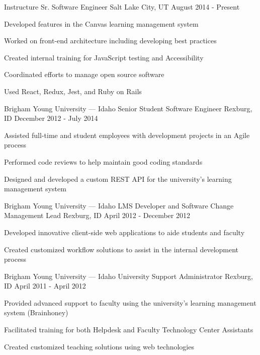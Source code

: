 \begin{cventries}
  \cventry
    {Instructure}
    {Sr. Software Engineer}
    {Salt Lake City, UT}
    {August 2014 - Present}
    {
      \begin{cvitems}
        \item {Developed features in the Canvas learning management system}
        \item {Worked on front-end architecture including developing best practices}
        \item {Created internal training for JavaScript testing and Accessibility}
        \item {Coordinated efforts to manage open source software}
        \item {Used React, Redux, Jest, and Ruby on Rails}
      \end{cvitems}
    }
  \cventry
    {Brigham Young University --- Idaho}
    {Senior Student Software Engineer}
    {Rexburg, ID}
    {December 2012 - July 2014}
    {
      \begin{cvitems}
        \item {Assisted full-time and student employees with development projects in an Agile process}
        \item {Performed code reviews to help maintain good coding standards}
        \item {Designed and developed a custom REST API for the university's learning management system}
      \end{cvitems}
    }
  \cventry
    {Brigham Young University --- Idaho}
    {LMS Developer and Software Change Management Lead}
    {Rexburg, ID}
    {April 2012 - December 2012}
    {
      \begin{cvitems}
        \item {Developed innovative client-side web applications to aide students and faculty}
        \item {Created customized workflow solutions to assist in the internal development process}
      \end{cvitems}
    }
  \cventry
    {Brigham Young University --- Idaho}
    {University Support Administrator}
    {Rexburg, ID}
    {April 2011 - April 2012}
    {
      \begin{cvitems}
        \item {Provided advanced support to faculty using the university's learning management system (Brainhoney)}
        \item {Facilitated training for both Helpdesk and Faculty Technology Center Assistants}
        \item {Created customized teaching solutions using web technologies}
      \end{cvitems}
    }
\end{cventries}
